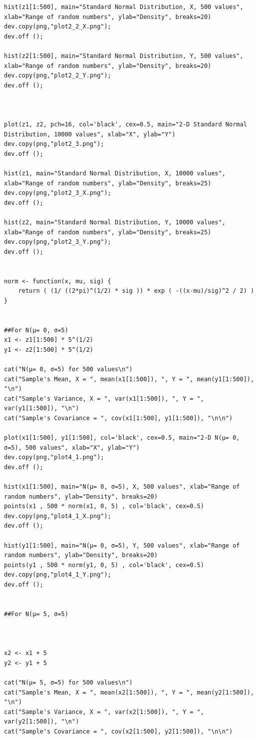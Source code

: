 \documentclass{article}
\begin{document}
\begin{lstlisting}
hist(z1[1:500], main="Standard Normal Distribution, X, 500 values", xlab="Range of random numbers", ylab="Density", breaks=20)
dev.copy(png,"plot2_2_X.png");
dev.off ();

hist(z2[1:500], main="Standard Normal Distribution, Y, 500 values", xlab="Range of random numbers", ylab="Density", breaks=20)
dev.copy(png,"plot2_2_Y.png");
dev.off ();



plot(z1, z2, pch=16, col='black', cex=0.5, main="2-D Standard Normal Distribution, 10000 values", xlab="X", ylab="Y")
dev.copy(png,"plot2_3.png");
dev.off ();

hist(z1, main="Standard Normal Distribution, X, 10000 values", xlab="Range of random numbers", ylab="Density", breaks=25)
dev.copy(png,"plot2_3_X.png");
dev.off ();

hist(z2, main="Standard Normal Distribution, Y, 10000 values", xlab="Range of random numbers", ylab="Density", breaks=25)
dev.copy(png,"plot2_3_Y.png");
dev.off ();


norm <- function(x, mu, sig) {
	return ( (1/ ((2*pi)^(1/2) * sig )) * exp ( -((x-mu)/sig)^2 / 2) )
}


##For N(μ= 0, σ=5)
x1 <- z1[1:500] * 5^(1/2)
y1 <- z2[1:500] * 5^(1/2)

cat("N(μ= 0, σ=5) for 500 values\n")
cat("Sample's Mean, X = ", mean(x1[1:500]), ", Y = ", mean(y1[1:500]), "\n")
cat("Sample's Variance, X = ", var(x1[1:500]), ", Y = ", var(y1[1:500]), "\n")
cat("Sample's Covariance = ", cov(x1[1:500], y1[1:500]), "\n\n")

plot(x1[1:500], y1[1:500], col='black', cex=0.5, main="2-D N(μ= 0, σ=5), 500 values", xlab="X", ylab="Y")
dev.copy(png,"plot4_1.png");
dev.off ();

hist(x1[1:500], main="N(μ= 0, σ=5), X, 500 values", xlab="Range of random numbers", ylab="Density", breaks=20)
points(x1 , 500 * norm(x1, 0, 5) , col='black', cex=0.5)
dev.copy(png,"plot4_1_X.png");
dev.off ();

hist(y1[1:500], main="N(μ= 0, σ=5), Y, 500 values", xlab="Range of random numbers", ylab="Density", breaks=20)
points(y1 , 500 * norm(y1, 0, 5) , col='black', cex=0.5)
dev.copy(png,"plot4_1_Y.png");
dev.off ();


##For N(μ= 5, σ=5)



x2 <- x1 + 5
y2 <- y1 + 5

cat("N(μ= 5, σ=5) for 500 values\n")
cat("Sample's Mean, X = ", mean(x2[1:500]), ", Y = ", mean(y2[1:500]), "\n")
cat("Sample's Variance, X = ", var(x2[1:500]), ", Y = ", var(y2[1:500]), "\n")
cat("Sample's Covariance = ", cov(x2[1:500], y2[1:500]), "\n\n")


\end{lstlisting}
\end{document}
